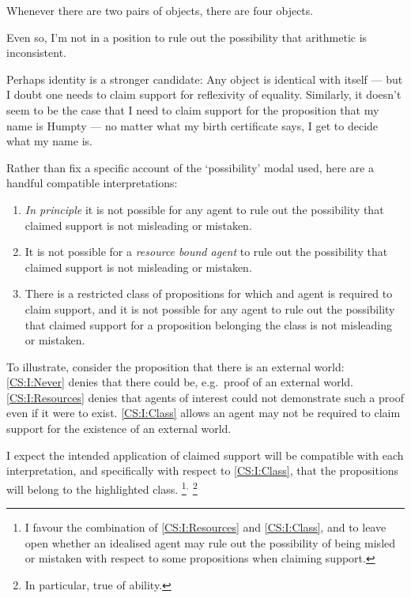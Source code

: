 \begin{note}
  Whenever there are two pairs of objects, there are four objects.

  Even so, I'm not in a position to rule out the possibility that arithmetic is inconsistent.

  Perhaps identity is a stronger candidate: Any object is identical with itself --- but I doubt one needs to claim support for reflexivity of equality.
  Similarly, it doesn't seem to be the case that I need to claim support for the proposition that my name is Humpty --- no matter what my birth certificate says, I get to decide what my name is.

  Rather than fix a specific account of the `possibility' modal used, here are a handful compatible interpretations:

  \begin{enumerate}[label=\Alph*., ref=(\Alph*)]
  \item\label{CS:I:Never} \emph{In principle} it is not possible for any agent to rule out the possibility that claimed support is not misleading or mistaken.
  \item\label{CS:I:Resources} It is not possible for a \emph{resource bound agent} to rule out the possibility that claimed support is not misleading or mistaken.
  \item\label{CS:I:Class} There is a restricted class of propositions for which and agent is required to claim support, and it is not possible for any agent to rule out the possibility that claimed support for a proposition belonging the class is not misleading or mistaken.
  \end{enumerate}

  To illustrate, consider the proposition that there is an external world:
  \ref{CS:I:Never} denies that there could be, e.g.\ proof of an external world.
  \ref{CS:I:Resources} denies that agents of interest could not demonstrate such a proof even if it were to exist.
  \ref{CS:I:Class} allows an agent may not be required to claim support for the existence of an external world.

  I expect the intended application of claimed support will be compatible with each interpretation, and specifically with respect to \ref{CS:I:Class}, that the propositions will belong to the highlighted class.\nolinebreak
  \footnote{
    I favour the combination of \ref{CS:I:Resources} and \ref{CS:I:Class}, and to leave open whether an idealised agent may rule out the possibility of being misled or mistaken with respect to some propositions when claiming support.
  }\(^{,}\)\nolinebreak
  \footnote{
    In particular, true of ability.
  }
\end{note}

